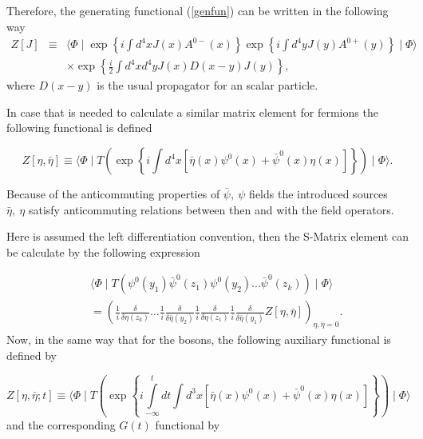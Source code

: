 \documentclass[12pt,letterpaper]{report}
\begin{document}
Therefore, the generating functional (\ref{genfun}) can be written
in the following way \cite{Gasiorowicz}
\begin{eqnarray}
Z\left[ J\right] &\equiv &\langle \Phi \mid \exp \left\{ i\int
d^4xJ\left(x\right) A^{0-}\left(x\right) \right\} \exp \left\{
i\int d^4yJ\left(y\right) A^{0+}\left(y\right) \right\} \mid \Phi
\rangle \nonumber \\ &&\times \exp \left\{ \frac i2\int
d^4xd^4yJ\left(x\right) D(x-y)J\left(y\right) \right\},
\label{bosones}
\end{eqnarray}
where $D(x-y)$ is the usual propagator for an scalar particle.

In case that is needed to calculate a similar matrix element for
fermions the following functional is defined

\begin{equation}
Z\left[ \eta,\bar{\eta}\right] \equiv \langle \Phi \mid T\left(
\exp \left\{ i\int d^4x\left[ \bar{\eta}\left(x\right) \psi
^0\left(x\right) + \bar{\psi}^0\left(x\right) \eta \left(x\right)
\right] \right\} \right) \mid \Phi \rangle.
\end{equation}

Because of the anticommuting properties of $\bar{\psi},\ \psi$
fields the introduced sources $\bar{\eta},\ \eta$ satisfy
anticommuting relations between then and with the field operators.

\newpage

Here is assumed the left differentiation convention, then the
S-Matrix element can be calculate by the following expression

\begin{eqnarray}
&&\langle \Phi \mid T\left(\psi ^0\left(y_1\right)
\bar{\psi}^0\left(z_1\right) \psi ^0\left(y_2\right)
...\bar{\psi}^0\left(z_k\right) \right) \mid \Phi \rangle
\nonumber \\ &&=\left(\frac 1i\frac \delta {\delta \eta \left(
z_k\right) }...\frac 1i\frac \delta {\delta \bar{\eta}\left(
y_2\right) }\frac 1i\frac \delta {\delta \eta \left(z_1\right)
}\frac 1i\frac \delta {\delta \bar{\eta} \left(y_1\right) }Z\left[
\eta,\bar{\eta}\right] \right) _{\eta,\bar{\eta} =0}.
\end{eqnarray}
Now, in the same way that for the bosons, the following auxiliary
functional is defined by

\begin{equation}
Z\left[ \eta,\bar{\eta};t\right] \equiv \langle \Phi \mid T\left(
\exp \left\{ i\int\limits_{-\infty }^tdt\int d^3x\left[
\bar{\eta}\left(x\right) \psi ^0\left(x\right) +\bar{\psi}^0\left(
x\right) \eta \left(x\right) \right] \right\} \right) \mid \Phi
\rangle
\end{equation}
and the corresponding $G\left(t\right)$ functional by
\end{document}
